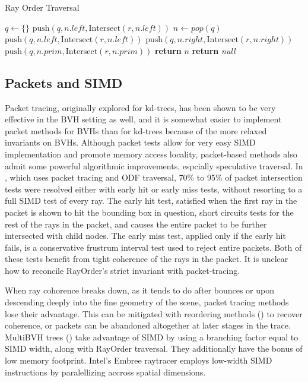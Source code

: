 \documentclass[twocolumn]{article}
\newcommand{\leaves}{\mathit{leaves}}
\newcommand{\branches}{\mathit{branches}}
\newcommand{\bleft}{\mathit{left}}
\newcommand{\bright}{\mathit{right}}
\begin{document}
\begin{algorithm}
\caption{Ray Order Traversal}\label{RayOrder}
\begin{algorithmic}[1]
	\State $q \gets \{\}$
			\State $\mathrm{push}(q, n.\bleft, \mathrm{Intersect}(r,n.\bleft))$
		\State $n\gets \mathit{pop}(q)$ 
		\If{$n \in \branches(b)$}
			\State $\mathrm{push}(q, n.\bleft, \mathrm{Intersect}(r,n.\bleft))$
			\State $\mathrm{push}(q, n.\bright, \mathrm{Intersect}(r,n.\bright))$
		\ElsIf{$n \in \leaves(b)$}
				\State $\mathrm{push}(q, n.\mathit{prim}, \mathrm{Intersect}(r,n.\mathit{prim}))$
			\EndIf
			\State \textbf{return} $n$
		\EndIf
	\EndWhile
	\State \textbf{return} \textit{null}
\EndProcedure
\end{algorithmic}
\end{algorithm}

\subsection{Packets and SIMD}

Packet tracing, originally explored for kd-trees, has been shown to be very effective in the BVH setting as well, and it is somewhat easier to implement packet methods for BVHs than for kd-trees because of the more relaxed invariants on BVHs.  Although packet tests allow for very easy SIMD implementation and promote memory access locality, packet-based methods also admit some powerful algorithmic improvements, espcially speculative traversal.  In \cite{Wald07}, which uses packet tracing and ODF traversal, 70\% to 95\% of packet intersection tests were resolved either with early hit or early miss tests, without resorting to a full SIMD test of every ray.  The early hit test, satisfied when the first ray in the packet is shown to hit the bounding box in question, short circuits tests for the rest of the rays in the packet, and causes the entire packet to be further intersected with child nodes.  The early miss test, applied only if the early hit fails, is a conservative frustrum interval test used to reject entire packets. Both of these tests benefit from tight coherence of the rays in the packet.  It is unclear how to reconcile RayOrder's strict invariant with packet-tracing.

When ray cohorence breaks down, as it tends to do after bounces or upon descending deeply into the fine geometry of the scene, packet tracing methods lose their advantage.  This can be mitigated with reordering methods (\cite{Boulos08}) to recover coherence, or packets can be abandoned altogether at later stages in the trace.  MultiBVH trees (\cite{Wald08}) take advantage of SIMD by using a branching factor equal to SIMD width, along with RayOrder traversal.  They additionally have the bonus of low memory footprint.  Intel's Embree raytracer employs low-width SIMD instructions by paralellizing accross spatial dimensions.
\end{document}
